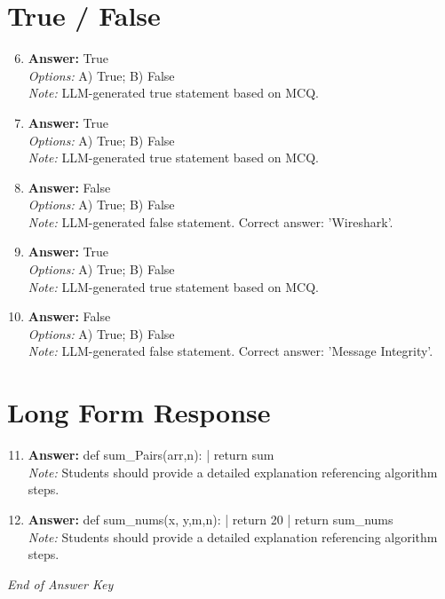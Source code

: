 \documentclass[12pt]{article}
\begin{document}
\section*{True / False}
\begin{enumerate}[label=\arabic*.]
\setcounter{enumi}{5}
\item \textbf{Answer:} True
\\ \textit{Options:} A) True; B) False
\\ \textit{Note:} LLM-generated true statement based on MCQ.
\item \textbf{Answer:} True
\\ \textit{Options:} A) True; B) False
\\ \textit{Note:} LLM-generated true statement based on MCQ.
\item \textbf{Answer:} False
\\ \textit{Options:} A) True; B) False
\\ \textit{Note:} LLM-generated false statement. Correct answer: 'Wireshark'.
\item \textbf{Answer:} True
\\ \textit{Options:} A) True; B) False
\\ \textit{Note:} LLM-generated true statement based on MCQ.
\item \textbf{Answer:} False
\\ \textit{Options:} A) True; B) False
\\ \textit{Note:} LLM-generated false statement. Correct answer: 'Message Integrity'.
\end{enumerate}

\section*{Long Form Response}
\begin{enumerate}[label=\arabic*.]
\setcounter{enumi}{10}
\item \textbf{Answer:} def sum\_Pairs(arr,n): | return sum
\\ \textit{Note:} Students should provide a detailed explanation referencing algorithm steps.
\item \textbf{Answer:} def sum\_nums(x, y,m,n): | return 20 | return sum\_nums
\\ \textit{Note:} Students should provide a detailed explanation referencing algorithm steps.
\end{enumerate}

\vfill
\noindent\textit{End of Answer Key}
\end{document}
